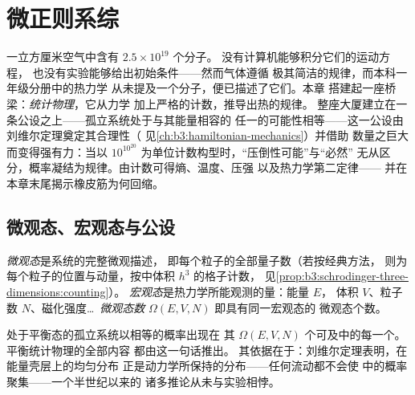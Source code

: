 \chapter{微正则系综}\label{ch:b3:microcanonical-ensemble}

一立方厘米空气中含有 $2.5\times10^{19}$ 个分子。
没有计算机能够积分它们的运动方程，
也没有实验能够给出初始条件——然而气体遵循
极其简洁的规律，而本科一年级分册中的热力学
从未提及一个分子，便已描述了它们。本章
搭建起一座桥梁：\emph{统计物理}，它从力学
加上严格的计数，推导出热的规律。
整座大厦建立在一条公设之上——孤立系统处于与其能量相容的
任一的可能性相等——这一公设由
刘维尔定理奠定其合理性（
见\cref{ch:b3:hamiltonian-mechanics}）并借助
数量之巨大而变得强有力：当以
$10^{10^{20}}$ 为单位计数构型时，“压倒性可能”与“必然”
无从区分，概率凝结为规律。由计数可得熵、温度、压强
以及热力学第二定律——
并在本章末尾揭示橡皮筋为何回缩。

\section{微观态、宏观态与公设}

\begin{definition}[微观态与宏观态]\label{def:b3:microcanonical-ensemble:states}
\emph{微观态}是系统的完整微观描述，
即每个粒子的全部量子数（若按经典方法，
则为每个粒子的位置与动量，按中体积 $h^3$ 的格子计数，
见\cref{prop:b3:schrodinger-three-dimensions:counting}）。
\emph{宏观态}是热力学所能观测的量：能量 $E$，
体积 $V$、粒子数 $N$、磁化强度\dots\ 
\emph{微观态数} $\Omega(E, V, N)$ 即具有同一宏观态的
微观态个数。
\end{definition}

\begin{theorem}[基本公设]\label{thm:b3:microcanonical-ensemble:postulate}
\index{微正则系综}\index{基本公设}
处于平衡态的孤立系统以相等的概率出现在
其 $\Omega(E, V, N)$ 个可及中的每一个。平衡统计物理的全部内容
都由这一句话推出。
其依据在于：刘维尔定理表明，在能量壳层上的均匀分布
正是动力学所保持的分布——任何流动都不会使
中的概率聚集——一个半世纪以来的
诸多推论从未与实验相悖。
\end{theorem}
\admitted

